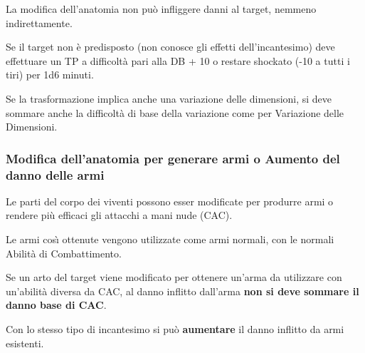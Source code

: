 La modifica dell'anatomia non pu\`o infliggere danni al target, nemmeno
indirettamente. 

Se il target non \`e predisposto (non conosce gli effetti
dell'incantesimo) deve effettuare un TP a difficolt\`a pari alla DB
+ 10 o restare shockato (-10 a tutti i tiri) per 1d6 minuti.

Se la trasformazione implica anche una variazione delle
dimensioni, si deve sommare anche la difficolt\`a di base della
variazione come per Variazione delle Dimensioni.

 


\subsubsection{Modifica dell'anatomia per
generare armi o Aumento del danno delle armi} 

Le parti del corpo dei viventi possono esser modificate per produrre
armi o rendere pi\`u efficaci gli attacchi a mani nude (CAC).

Le armi cos\`{\i} ottenute vengono utilizzate come armi normali, con
le normali Abilit\`a di Combattimento.

Se un arto del target viene modificato per ottenere un'arma da
utilizzare con un'abilit\`a diversa da CAC, al danno inflitto dall'arma
\textbf{non si deve sommare il danno base di CAC}.

Con lo stesso tipo di incantesimo si pu\`o \textbf{aumentare} il danno
inflitto da armi esistenti.




